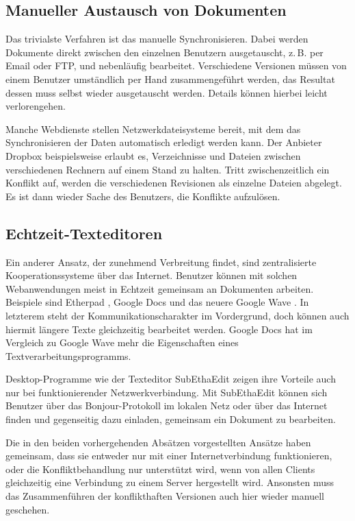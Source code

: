 \subsection{Manueller Austausch von Dokumenten}

Das trivialste Verfahren ist das manuelle Synchronisieren. Dabei werden Dokumente direkt zwischen den einzelnen Benutzern ausgetauscht, z.\,B. per Email oder FTP, und nebenläufig bearbeitet. Verschiedene Versionen müssen von einem Benutzer umständlich per Hand zusammengeführt werden, das Resultat dessen muss selbst wieder ausgetauscht werden. Details können hierbei leicht verlorengehen. 

Manche Webdienste stellen Netzwerkdateisysteme bereit, mit dem das Synchronisieren der Daten automatisch erledigt werden kann. Der Anbieter Dropbox \cite{dropbox:website} beispielsweise erlaubt es, Verzeichnisse und Dateien zwischen verschiedenen Rechnern auf einem Stand zu halten. Tritt zwischenzeitlich ein Konflikt auf, werden die verschiedenen Revisionen als einzelne Dateien abgelegt. Es ist dann wieder Sache des Benutzers, die Konflikte aufzulösen.

\subsection{Echtzeit-Texteditoren}
\label{subsec:workflow}

Ein anderer Ansatz, der zunehmend Verbreitung findet, sind zentralisierte Kooperationssysteme über das Internet. Benutzer können mit solchen Webanwendungen meist in Echtzeit gemeinsam an Dokumenten arbeiten. Beispiele sind Etherpad \cite{etherpad}, Google Docs \cite{google:docs} und das neuere Google Wave \cite{google:wave}. In letzterem steht der Kommunikationscharakter im Vordergrund, doch können auch hiermit längere Texte gleichzeitig bearbeitet werden. Google Docs hat im Vergleich zu Google Wave mehr die Eigenschaften eines Textverarbeitungsprogramms. 

Desktop-Programme wie der Texteditor SubEthaEdit \cite{subethaedit:website} zeigen ihre Vorteile auch nur bei funktionierender Netzwerkverbindung. Mit SubEthaEdit können sich Benutzer über das Bonjour-Protokoll im lokalen Netz oder über das Internet finden und gegenseitig dazu einladen, gemeinsam ein Dokument zu bearbeiten. 

Die in den beiden vorhergehenden Absätzen vorgestellten Ansätze haben gemeinsam, dass sie entweder nur mit einer Internetverbindung funktionieren, oder die Konfliktbehandlung nur unterstützt wird, wenn von allen Clients gleichzeitig eine Verbindung zu einem Server hergestellt wird. Ansonsten muss das Zusammenführen der konflikthaften Versionen auch hier wieder manuell geschehen.


